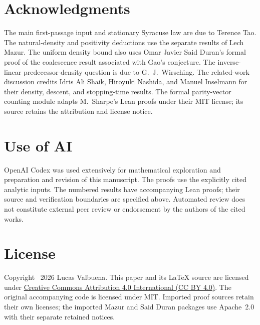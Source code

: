 \documentclass[11pt,a4paper]{article}
\begin{document}
\section*{Acknowledgments}
The main first-passage input and stationary Syracuse law are due to
Terence Tao. The natural-density and positivity deductions use the
separate results of Lech Mazur. The uniform density bound also uses Omar Javier Said Duran's formal
proof of the coalescence result associated with Gao's conjecture.
The inverse-linear predecessor-density question is due to G.\ J.\ Wirsching.
The related-work discussion credits Idris Ali Shaik, Hiroyuki Nashida,
and Manuel Inselmann for their density, descent, and stopping-time results.
The formal parity-vector counting module adapts M.~Sharpe's Lean
proofs under their MIT license; its source retains the attribution
and license notice.

\section*{Use of AI}
OpenAI Codex was used extensively for mathematical exploration and
preparation and revision of this manuscript. The proofs use the
explicitly cited analytic inputs. The numbered results have accompanying Lean proofs; their
source and verification boundaries are specified above.
Automated review does not constitute external peer review or endorsement
by the authors of the cited works.

\section*{License}
Copyright \textcopyright\ 2026 Lucas Valbuena.
This paper and its LaTeX source are licensed under
\href{https://creativecommons.org/licenses/by/4.0/}{Creative Commons
Attribution 4.0 International (CC BY 4.0)}. The original accompanying
code is licensed under MIT. Imported proof sources retain their own
licenses; the imported Mazur and Said Duran packages use Apache~2.0
with their separate retained notices.
\end{document}

